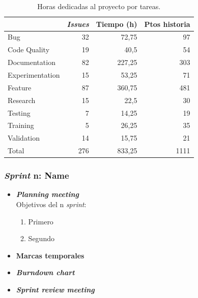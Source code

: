 \begin{table}[]
    \centering
    \begin{tabular}{lrrr}
	\toprule
        ~ & \textbf{\textit{Issues}} & \textbf{Tiempo (h)} & \textbf{Ptos historia} \\ 
        \toprule
        Bug & 32 & 72,75 & 97 \\ 
        Code Quality & 19 & 40,5 & 54 \\ 
        Documentation & 82 & 227,25 & 303 \\ 
        Experimentation & 15 & 53,25 & 71 \\
        Feature & 87 & 360,75 & 481 \\ 
        Research & 15 & 22,5 & 30 \\ 
        Testing & 7 & 14,25 & 19 \\ 
        Training & 5 & 26,25 & 35 \\ 
        Validation & 14 & 15,75 & 21 \\ 
    \midrule
        Total & 276 & 833,25 & 1111 \\ 
   	\bottomrule
    \end{tabular}
    \caption{Horas dedicadas al proyecto por tareas.}\label{tab:summary}
\end{table}


\newpage
\subsubsection{\textit{Sprint} n: Name}
\begin{itemize}
\item \textbf{\textit{Planning meeting}}\\
Objetivos del n \textit{sprint}:
\begin{enumerate}
\item Primero
\item Segundo
\end{enumerate}

\item \textbf{Marcas temporales}\\

\item \textbf{\textit{Burndown chart}}\\

\item \textbf{\textit{Sprint review meeting}}\\

\end{itemize}

